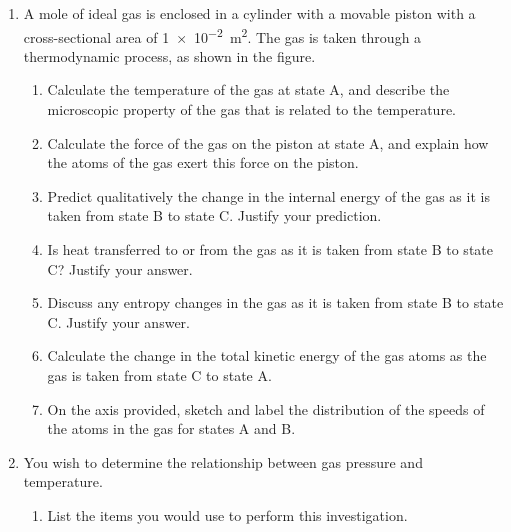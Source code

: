 \documentclass{../../../oss-apphys}
\begin{document}
\begin{enumerate}[leftmargin=15pt]
\item A mole of ideal gas is enclosed in a cylinder with a movable piston
  with a cross-sectional area of \SI{1e-2}{m^2}. The gas is taken through a
  thermodynamic process, as shown in the figure.
  \begin{center}
  \end{center}
  \begin{enumerate}[leftmargin=18pt]
  \item Calculate the temperature of the gas at state A, and describe the
    microscopic property of the gas that is related to the
    temperature.
    \vspace{1in}
  \item Calculate the force of the gas on the piston at state A, and
    explain how the atoms of the gas exert this force on the piston.
    \vspace{1in}
  \item Predict qualitatively the change in the internal energy of the gas
    as it is taken from state B to state C. Justify your prediction.
    \vspace{1in}
  \item Is heat transferred to or from the gas as it is taken from state B to
    state C? Justify your answer.
    \newpage

  \item Discuss any entropy changes in the gas as it is taken from state B
    to state C. Justify your answer.
    \vspace{1in}
  \item Calculate the change in the total kinetic energy of the gas atoms
    as the gas is taken from state C to state A.
    \vspace{1in}
  \item On the axis provided, sketch and label the distribution of the speeds
    of the atoms in the gas for states A and B.
    \begin{center}
    \end{center}
  \end{enumerate}

\item You wish to determine the relationship between gas pressure and
  temperature.
  \begin{enumerate}[leftmargin=18pt]
  \item List the items you would use to perform this investigation.
    \newpage
    

\end{enumerate}
\end{enumerate}
\end{document}
